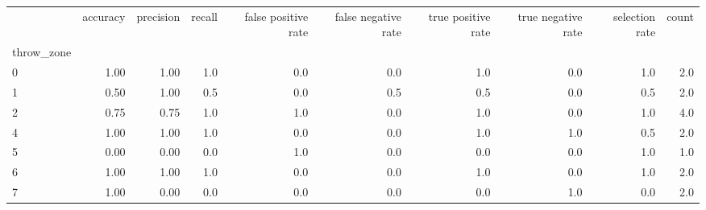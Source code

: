 \begin{tabular}{lrrrrrrrrr}
\toprule
{} &  accuracy &  precision &  recall &  false positive rate &  false negative rate &  true positive rate &  true negative rate &  selection rate &  count \\
throw\_zone &           &            &         &                      &                      &                     &                     &                 &        \\
\midrule
0          &      1.00 &       1.00 &     1.0 &                  0.0 &                  0.0 &                 1.0 &                 0.0 &             1.0 &    2.0 \\
1          &      0.50 &       1.00 &     0.5 &                  0.0 &                  0.5 &                 0.5 &                 0.0 &             0.5 &    2.0 \\
2          &      0.75 &       0.75 &     1.0 &                  1.0 &                  0.0 &                 1.0 &                 0.0 &             1.0 &    4.0 \\
4          &      1.00 &       1.00 &     1.0 &                  0.0 &                  0.0 &                 1.0 &                 1.0 &             0.5 &    2.0 \\
5          &      0.00 &       0.00 &     0.0 &                  1.0 &                  0.0 &                 0.0 &                 0.0 &             1.0 &    1.0 \\
6          &      1.00 &       1.00 &     1.0 &                  0.0 &                  0.0 &                 1.0 &                 0.0 &             1.0 &    2.0 \\
7          &      1.00 &       0.00 &     0.0 &                  0.0 &                  0.0 &                 0.0 &                 1.0 &             0.0 &    2.0 \\
\bottomrule
\end{tabular}
